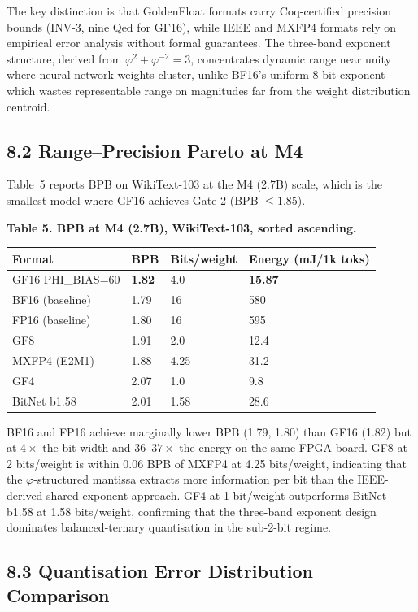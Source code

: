 The key distinction is that GoldenFloat formats
carry Coq-certified precision bounds (INV-3, nine
Qed for GF16), while IEEE and MXFP4 formats rely on
empirical error analysis without formal guarantees.
The three-band exponent structure, derived from
\(\varphi^2 + \varphi^{-2} = 3\), concentrates
dynamic range near unity where neural-network
weights cluster, unlike BF16's uniform 8-bit
exponent which wastes representable range on
magnitudes far from the weight distribution centroid.

\subsection{8.2 Range--Precision Pareto at
M4}\label{fa_09:range-precision-pareto-at-m4}

Table~5 reports BPB on WikiText-103 at the M4
(2.7B) scale, which is the smallest model where
GF16 achieves Gate-2 (BPB \(\leq 1.85\)).

\textbf{Table 5. BPB at M4 (2.7B), WikiText-103,
sorted ascending.}

\begin{longtable}[]{@{}llll@{}}
\toprule\noalign{}
Format & BPB & Bits/weight & Energy (mJ/1k toks) \\
\midrule\noalign{}
\endhead
\bottomrule\noalign{}
\endlastfoot
GF16 PHI\_BIAS=60 & \textbf{1.82} & 4.0 &
\textbf{15.87} \\
BF16 (baseline) & 1.79 & 16 & 580 \\
FP16 (baseline) & 1.80 & 16 & 595 \\
GF8 & 1.91 & 2.0 & 12.4 \\
MXFP4 (E2M1) & 1.88 & 4.25 & 31.2 \\
GF4 & 2.07 & 1.0 & 9.8 \\
BitNet b1.58 & 2.01 & 1.58 & 28.6 \\
\end{longtable}

BF16 and FP16 achieve marginally lower BPB (1.79,
1.80) than GF16 (1.82) but at \(4\times\) the
bit-width and \(36\text{--}37\times\) the energy on
the same FPGA board. GF8 at 2 bits/weight is within
0.06 BPB of MXFP4 at 4.25 bits/weight, indicating
that the \(\varphi\)-structured mantissa extracts
more information per bit than the IEEE-derived
shared-exponent approach. GF4 at 1 bit/weight
outperforms BitNet b1.58 at 1.58 bits/weight,
confirming that the three-band exponent design
dominates balanced-ternary quantisation in the
sub-2-bit regime.

\subsection{8.3 Quantisation Error Distribution
Comparison}\label{fa_09:quantisation-error-comparison}

